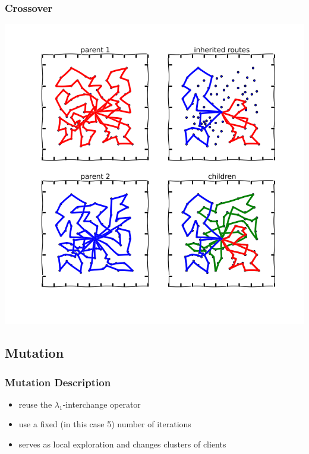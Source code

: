 \documentclass{beamer}
\begin{document}
\begin{frame}
\frametitle{Crossover}
\begin{center}
\includegraphics[scale=0.25]{figs/crossover}

\end{center}

\begin{center}
\end{center}
\end{frame}




\subsection{Mutation}
\begin{frame}
\frametitle{Mutation Description}
\begin{itemize}
	\item reuse the $\lambda_1$-interchange operator
	\item use a fixed (in this case 5) number of iterations
	\item serves as local exploration and changes clusters of clients
\end{itemize}
\end{frame}
\end{document}
